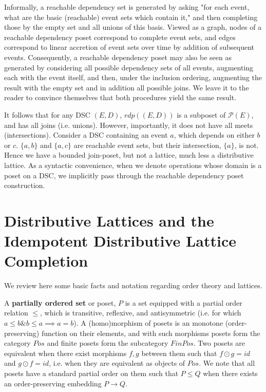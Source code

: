 \documentclass[hoptionsi,review,format=acmsmall]{acmart}
\theoremstyle{definition}
\newcommand{\Pc}{\mathcal{P}}
\newcommand{\band}{\mathbin{\&}}
\begin{document}
Informally, a reachable dependency set is generated by asking "for each event, what are the basic (reachable) event sets which contain it," and then completing those by the empty set and all unions of this basis. Viewed as a graph, nodes of a reachable dependency poset correspond to complete event sets, and edges correspond to linear accretion of event sets over time by addition of subsequent events. Consequently, a reachable dependency poset may also be seen as generated by considering all possible dependency sets of all events, augmenting each with the event itself, and then, under the inclusion ordering, augmenting the result with the empty set and in addition all possible joins. We leave it to the reader to convince themselves that both procedures yield the same result.

It follows that for any DSC \((E,D)\), \(rdp((E,D))\)  is a subposet of \(\Pc(E)\), and has all joins (i.e. unions). However, importantly, it does not have all meets (intersections). Consider a DSC containing an event \(a\), which depends on either \(b\) or \(c\). \(\{a,b\}\) and  \(\{a,c\}\) are reachable event sets, but their intersection, \(\{a\}\), is not. Hence we have a bounded join-poset, but not a lattice, much less a distributive lattice. As a syntactic convenience, when we denote operations whose domain is a poset on a DSC, we implicitly pass through the reachable dependency poset construction.

\section{Distributive Lattices and the Idempotent Distributive Lattice Completion}

We review here some basic facts and notation regarding order theory and lattices.

A \textbf{partially ordered set} or poset, \(P\) is a set equipped with a partial order relation \(\le\), which is transitive,  reflexive, and antisymmetric (i.e. for which \( a \le b \band b \le a \implies a = b\)). A (homo)morphism of posets is an monotone (order-preserving) function on their elements, and with such morphisms posets form the category \(Pos\) and finite posets form the subcategory \(FinPos\). Two posets are equivalent when there exist morphisms \(f, g\) between them such that \(f \odot g = id\) and \(g \odot f = id\), i.e. when they are equivalent as objects of \(Pos\). We note that all posets have a standard partial order on them such that \(P \le Q\) when there exists an order-preserving embedding \(P \rightarrow Q\).
\end{document}
